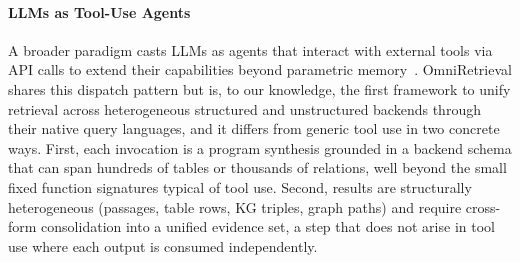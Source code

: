 \paragraph{LLMs as Tool-Use Agents}
A broader paradigm casts LLMs as agents that interact with external tools via API calls to extend their capabilities beyond parametric memory~\citep{ReAct, Toolformer, ToolLLM, Gorilla}. OmniRetrieval shares this dispatch pattern but is, to our knowledge, the first framework to unify retrieval across heterogeneous structured and unstructured backends through their native query languages, and it differs from generic tool use in two concrete ways. First, each invocation is a program synthesis grounded in a backend schema that can span hundreds of tables or thousands of relations, well beyond the small fixed function signatures typical of tool use. Second, results are structurally heterogeneous (passages, table rows, KG triples, graph paths) and require cross-form consolidation into a unified evidence set, a step that does not arise in tool use where each output is consumed independently.
